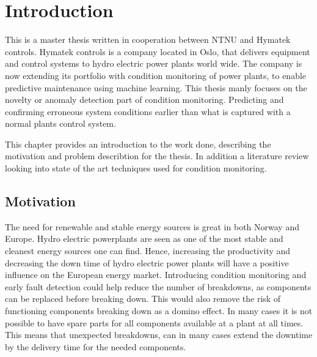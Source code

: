 \chapter{Introduction}\label{cha:introduction}
%

This is a master thesis written in cooperation between NTNU and Hymatek controls. Hymatek controls is a company located in Oslo, that delivers equipment and control systems to hydro electric power plants world wide. The company is now extending its portfolio with condition monitoring of power plants, to enable predictive maintenance using machine learning. This thesis manly focuses on the novelty or anomaly detection part of condition monitoring. Predicting and confirming erroneous system conditions earlier than what is captured with a normal plants control system.   

This chapter provides an introduction to the work done, describing the motivation and problem describtion for the thesis. In addition a literature review looking into state of the art techniques used for condition monitoring. 


\section{Motivation}\label{sec:motivation}


The need for renewable and stable energy sources is great in both Norway and Europe. Hydro electric powerplants are seen as one of the most stable and cleanest energy sources one can find. Hence, increasing the productivity and decreasing the down time of hydro electric power plants will have a positive influence on the European energy market. Introducing condition monitoring and early fault detection could help reduce the number of breakdowns, as components can be replaced before breaking down. This would also remove the risk of functioning components breaking down as a domino effect. In many cases it is not possible to have spare parts for all components available at a plant at all times. This means that unexpected breakdowns, can in many cases extend the downtime by the delivery time for the needed components.


